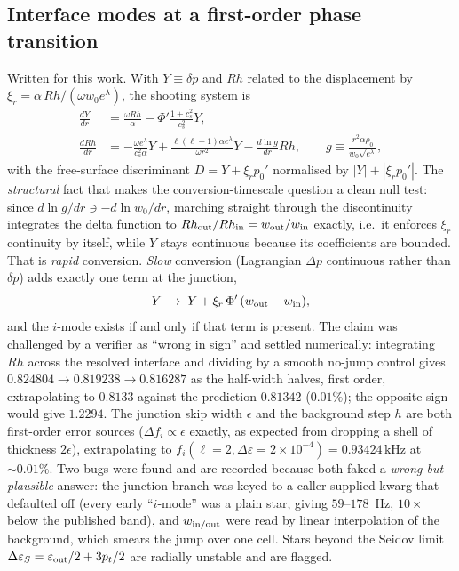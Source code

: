 \documentclass[aps,prd,preprint,amsmath,amssymb,nofootinbib,longbibliography]{revtex4-2}
\newcommand{\kHz}{\,\mathrm{kHz}}
\newcommand{\cs}{c_s}
\begin{document}
\subsection{Interface modes at a first-order phase transition}
\label{sec:imode}
Written for this work. With $Y \equiv \delta p$ and $Rh$ related to the displacement by
$\xi_r = \alpha\,Rh/(\omega w_0 e^{\lambda})$, the shooting system is
\begin{align}
\frac{dY}{dr} &= \frac{\omega Rh}{\alpha} - \Phi'\frac{1+\cs^2}{\cs^2}Y, \\
\frac{dRh}{dr} &= -\frac{\omega e^{\lambda}}{\cs^2\alpha}Y + \frac{\ell(\ell+1)\alpha e^{\lambda}}{\omega r^2}Y
 - \frac{d\ln g}{dr}Rh, \qquad g \equiv \frac{r^2\alpha\rho_0}{w_0\sqrt{e^{\lambda}}},
\end{align}
with the free-surface discriminant $D = Y + \xi_r p_0'$ normalised by $|Y|+|\xi_r p_0'|$. The
\emph{structural} fact that makes the conversion-timescale question a clean null test: since
$d\ln g/dr \ni -d\ln w_0/dr$, marching straight through the discontinuity integrates the delta
function to $Rh_{\rm out}/Rh_{\rm in} = w_{\rm out}/w_{\rm in}$ exactly, i.e.\ it enforces
$\xi_r$ continuity by itself, while $Y$ stays continuous because its coefficients are bounded.
That is \emph{rapid} conversion. \emph{Slow} conversion (Lagrangian $\Delta p$ continuous rather
than $\delta p$) adds exactly one term at the junction,
\begin{equation}
Y \;\to\; Y + \xi_r\,\Phi'\,(w_{\rm out}-w_{\rm in}),
\end{equation}
and the $i$-mode exists if and only if that term is present. The claim was challenged by a
verifier as ``wrong in sign'' and settled numerically: integrating $Rh$ across the resolved
interface and dividing by a smooth no-jump control gives $0.824804\to0.819238\to0.816287$ as the
half-width halves, first order, extrapolating to $0.8133$ against the prediction $0.81342$
($0.01\%$); the opposite sign would give $1.2294$. The junction skip width $\epsilon$ and the
background step $h$ are both first-order error sources ($\Delta f_i \propto \epsilon$ exactly,
as expected from dropping a shell of thickness $2\epsilon$), extrapolating to
$f_i(\ell=2,\Delta\varepsilon=2\times10^{-4}) = 0.93424\kHz$ at $\sim0.01\%$. Two bugs were
found and are recorded because both faked a \emph{wrong-but-plausible} answer: the junction
branch was keyed to a caller-supplied kwarg that defaulted off (every early ``$i$-mode'' was a
plain star, giving $59$--$178$~Hz, $10\times$ below the published band), and $w_{\rm in/out}$
were read by linear interpolation of the background, which smears the jump over one cell.
Stars beyond the Seidov limit $\Delta\varepsilon_S = \varepsilon_{\rm out}/2 + 3p_t/2$ are
radially unstable and are flagged.
\end{document}
